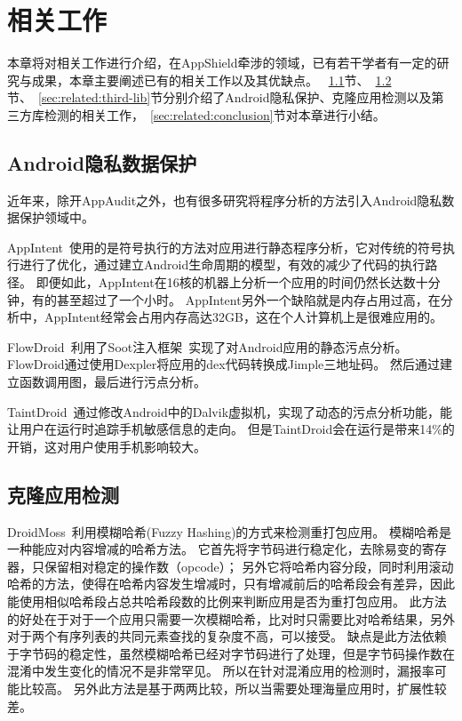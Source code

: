 \chapter{相关工作}
\label{chap:related-work}

本章将对相关工作进行介绍，在AppShield牵涉的领域，已有若干学者有一定的研究与成果，本章主要阐述已有的相关工作以及其优缺点。
~\ref{sec:related:privacy-protect}节、~\ref{sec:related:clone-app}节、~\ref{sec:related:third-lib}节分别介绍了Android隐私保护、克隆应用检测以及第三方库检测的相关工作，~\ref{sec:related:conclusion}节对本章进行小结。

\section{Android隐私数据保护}
\label{sec:related:privacy-protect}

近年来，除开AppAudit之外，也有很多研究将程序分析的方法引入Android隐私数据保护领域中。

AppIntent~\supercite{appintent}使用的是符号执行的方法对应用进行静态程序分析，它对传统的符号执行进行了优化，通过建立Android生命周期的模型，有效的减少了代码的执行路径。
即便如此，AppIntent在16核的机器上分析一个应用的时间仍然长达数十分钟，有的甚至超过了一个小时。
AppIntent另外一个缺陷就是内存占用过高，在分析中，AppIntent经常会占用内存高达32GB，这在个人计算机上是很难应用的。

FlowDroid~\supercite{flowdroid}利用了Soot注入框架~\supercite{soot}实现了对Android应用的静态污点分析。
FlowDroid通过使用Dexpler将应用的dex代码转换成Jimple三地址码。
然后通过建立函数调用图，最后进行污点分析。

TaintDroid~\supercite{taintdroid}通过修改Android中的Dalvik虚拟机，实现了动态的污点分析功能，能让用户在运行时追踪手机敏感信息的走向。
但是TaintDroid会在运行是带来14\%的开销，这对用户使用手机影响较大。

\section{克隆应用检测}
\label{sec:related:clone-app}

DroidMoss~\supercite{droidmoss}利用模糊哈希(Fuzzy Hashing)的方式来检测重打包应用。
模糊哈希是一种能应对内容增减的哈希方法。
它首先将字节码进行稳定化，去除易变的寄存器，只保留相对稳定的操作数（opcode）；
另外它将哈希内容分段，同时利用滚动哈希的方法，使得在哈希内容发生增减时，只有增减前后的哈希段会有差异，因此能使用相似哈希段占总共哈希段数的比例来判断应用是否为重打包应用。
此方法的好处在于对于一个应用只需要一次模糊哈希，比对时只需要比对哈希结果，另外对于两个有序列表的共同元素查找的复杂度不高，可以接受。
缺点是此方法依赖于字节码的稳定性，虽然模糊哈希已经对字节码进行了处理，但是字节码操作数在混淆中发生变化的情况不是非常罕见。
所以在针对混淆应用的检测时，漏报率可能比较高。
另外此方法是基于两两比较，所以当需要处理海量应用时，扩展性较差。

